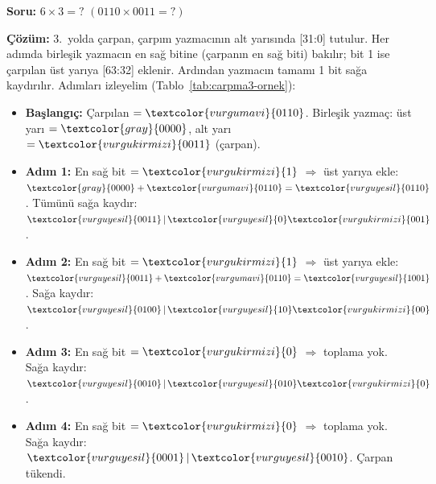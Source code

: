 \FloatBarrier
\begin{ornek}[5.6]
\textbf{Soru:} $6 \times 3 = ?$ \quad $(0110 \times 0011 = ?)$

\textbf{Çözüm:} 3.\ yolda çarpan, çarpım yazmacının alt yarısında [31:0] tutulur. Her adımda birleşik yazmacın en sağ bitine (çarpanın en sağ biti) bakılır; bit 1 ise çarpılan üst yarıya [63:32] eklenir. Ardından yazmacın tamamı 1 bit sağa kaydırılır. Adımları izleyelim (Tablo~\ref{tab:carpma3-ornek}):

\begin{itemize}[nosep]
\item \textbf{Başlangıç:} Çarpılan $= \textcolor{vurgumavi}{0110}$. Birleşik yazmaç: üst yarı $= \textcolor{gray}{0000}$, alt yarı $= \textcolor{vurgukirmizi}{0011}$ (çarpan).
\item \textbf{Adım 1:} En sağ bit $= \textcolor{vurgukirmizi}{1}$ $\Rightarrow$ üst yarıya ekle: $\textcolor{gray}{0000} + \textcolor{vurgumavi}{0110} = \textcolor{vurguyesil}{0110}$. Tümünü sağa kaydır: $\textcolor{vurguyesil}{0011}\,|\,\textcolor{vurguyesil}{0}\textcolor{vurgukirmizi}{001}$.
\item \textbf{Adım 2:} En sağ bit $= \textcolor{vurgukirmizi}{1}$ $\Rightarrow$ üst yarıya ekle: $\textcolor{vurguyesil}{0011} + \textcolor{vurgumavi}{0110} = \textcolor{vurguyesil}{1001}$. Sağa kaydır: $\textcolor{vurguyesil}{0100}\,|\,\textcolor{vurguyesil}{10}\textcolor{vurgukirmizi}{00}$.
\item \textbf{Adım 3:} En sağ bit $= \textcolor{vurgukirmizi}{0}$ $\Rightarrow$ toplama yok. Sağa kaydır: $\textcolor{vurguyesil}{0010}\,|\,\textcolor{vurguyesil}{010}\textcolor{vurgukirmizi}{0}$.
\item \textbf{Adım 4:} En sağ bit $= \textcolor{vurgukirmizi}{0}$ $\Rightarrow$ toplama yok. Sağa kaydır: $\textcolor{vurguyesil}{0001}\,|\,\textcolor{vurguyesil}{0010}$. Çarpan tükendi.
\end{itemize}


\end{ornek}
